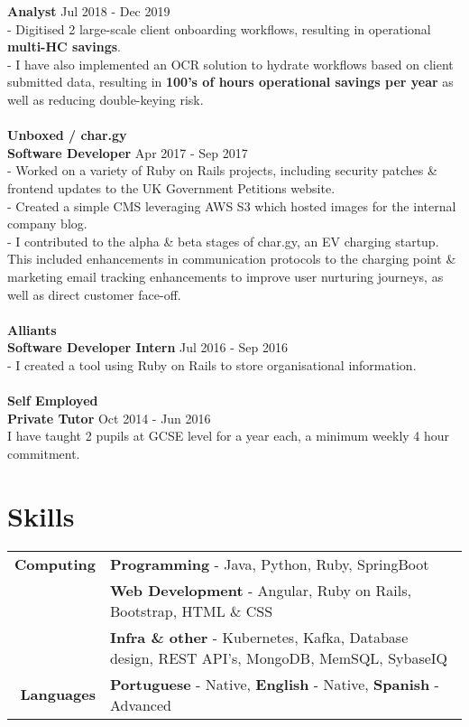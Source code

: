 \documentclass[a4paper,10pt]{article}
\begin{document}
		\textbf{Analyst}  \hfill Jul 2018 - Dec 2019
		\\ - Digitised 2 large-scale client onboarding workflows, resulting in operational \textbf{multi-HC savings}. 
		\\ - I have also implemented an OCR solution to hydrate workflows based on client submitted data, resulting in \textbf{100's of hours operational savings per year} as well as reducing double-keying risk.
		\\\\\hfill\textbf{Unboxed / char.gy} 
		\\\textbf{Software Developer} \hfill Apr 2017 - Sep 2017 
		\\ - Worked on a variety of Ruby on Rails projects, including security patches \& frontend updates to the UK Government Petitions website. 
		\\ - Created a simple CMS leveraging AWS S3 which hosted images for the internal company blog. 
		\\ - I contributed to the alpha \& beta stages of char.gy, an EV charging startup. This included enhancements in communication protocols to the charging point \& marketing email tracking enhancements to improve user nurturing journeys, as well as direct customer face-off.
		\\\\	
		\textbf{Alliants}
		\\\textbf{Software Developer Intern} \hfill Jul 2016 - Sep 2016
		\\ - I created a tool using Ruby on Rails to store organisational information.
		\\\\
		\textbf{Self Employed} 
		\\\textbf{Private Tutor} \hfill Oct 2014 - Jun 2016 
		\\ I have taught 2 pupils at GCSE level for a year each, a minimum weekly 4 hour commitment.

		
		

	

	
		\section*{Skills}
	
	\begin{tabular}{r|p{12cm}}	
		\textbf{Computing}	 & \textbf{Programming} - Java, Python, Ruby, SpringBoot  \\&
								\textbf{Web Development} - Angular, Ruby on Rails, Bootstrap, HTML \& CSS \\&
								\textbf{Infra \& other} - Kubernetes, Kafka, Database design, REST API's, MongoDB, MemSQL, SybaseIQ  \\
		\textbf{Languages}   & \textbf{Portuguese} - Native, \textbf{English} - Native, \textbf{Spanish} - Advanced
	\end{tabular}
	
\end{document}
